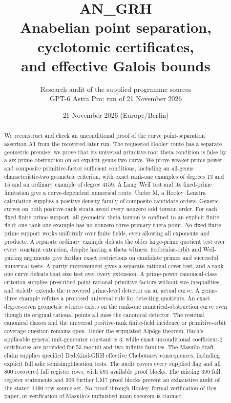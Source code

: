 \documentclass[11pt,a4paper]{article}
\title{\textbf{AN\_GRH}\\[7pt]Anabelian point separation, cyclotomic certificates,\\and effective Galois bounds}
\author{Research audit of the supplied programme sources\\GPT-6 Astra Pro; run of 21 November 2026}
\date{21 November 2026 (Europe/Berlin)}
\begin{document}
\maketitle
\begin{abstract}
We reconstruct and check an unconditional proof of the curve point-separation
assertion A1 from the recovered later run. The requested Hooley route has a
separate geometric premise: we prove that its universal primitive-root theta
condition is false by a six-prime obstruction on an explicit genus-two curve.
We prove weaker prime-power and composite primitive-factor sufficient
conditions, including an all-genus characteristic-two geometric criterion,
with exact rank-one examples of degrees $13$ and $15$ and an
ordinary example of degree $4159$. A Lang--Weil test and its fixed-prime
limitation give a curve-dependent numerical route. Under M, a Hooley--Lenstra
calculation supplies a positive-density family of composite candidate orders.
Generic curves on both positive-rank strata avoid every nonzero odd torsion
order. For each fixed finite prime support, all geometric theta torsion is
confined to an explicit finite field; one rank-one example has no nonzero
three-primary theta point. No fixed finite prime support works uniformly over
finite fields, even allowing all exponents and products. A separate ordinary
example defeats the older large-prime quotient test over every constant
extension, despite having a theta witness. Frobenius-orbit and Weil-pairing
arguments give further exact restrictions on candidate primes and successful
numerical tests. A parity improvement gives a separate rational cover test,
and a rank-one curve defeats that size test over every extension. A
prime-power canonical-class criterion supplies prescribed-point rational
primitive factors without size inequalities, and strictly extends the
recovered prime-level detector on an actual curve. A genus-three example
refutes a proposed universal rule for detecting quotients. An exact
degree-seven geometric witness exists on the rank-one numerical-obstruction
curve even though its original rational points all miss the canonical detector.
The residual canonical
classes and the universal
positive-rank finite-field incidence or primitive-orbit coverage question
remains open.
Under the stipulated Alp\"oge theorem, Bach's applicable general unit-generator
constant is $3$, while exact unconditional coefficient-$2$ certificates are
provided for $53$ moduli and two infinite families. The Masullo draft claim
supplies specified Dedekind-GRH effective Chebotarev consequences, including
explicit full adic semisimplification tests. The audit covers every supplied
flag and all $800$ recovered full register rows, with $591$ available proof
blocks. The missing $390$ full register statements and $209$ further LM7
proof blocks prevent an exhaustive audit of the stated $1190$-row source set.
No proof through Hooley, formal verification of this paper, or verification
of Masullo's unfinished main theorem is claimed.
\end{abstract}
\tableofcontents
\clearpage
\end{document}
